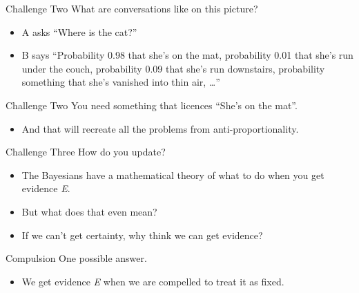 \documentclass[
  17pt,
  letterpaper,
  ignorenonframetext,
  aspectratio=169,
  handout]{beamer}
\providecommand{\tightlist}{%
  \setlength{\itemsep}{0pt}\setlength{\parskip}{0pt}}\usepackage{longtable,booktabs,array}
\begin{document}
\begin{frame}{Challenge Two}
\protect\hypertarget{challenge-two}{}
What are conversations like on this picture?

\begin{itemize}[<+->]
\tightlist
\item
  A asks ``Where is the cat?''
\item
  B says ``Probability 0.98 that she's on the mat, probability 0.01 that
  she's run under the couch, probability 0.09 that she's run downstairs,
  probability something that she's vanished into thin air, \ldots{}''
\end{itemize}
\end{frame}

\begin{frame}{Challenge Two}
\protect\hypertarget{challenge-two-1}{}
You need something that licences ``She's on the mat''.

\begin{itemize}[<+->]
\tightlist
\item
  And that will recreate all the problems from anti-proportionality.
\end{itemize}
\end{frame}

\begin{frame}{Challenge Three}
\protect\hypertarget{challenge-three}{}
How do you update?

\begin{itemize}[<+->]
\tightlist
\item
  The Bayesians have a mathematical theory of what to do when you get
  evidence \emph{E}.
\item
  But what does that even mean?
\item
  If we can't get certainty, why think we can get evidence?
\end{itemize}
\end{frame}

\begin{frame}{Compulsion}
\protect\hypertarget{compulsion-5}{}
One possible answer.

\begin{itemize}[<+->]
\tightlist
\item
  We get evidence \emph{E} when we are compelled to treat it as fixed.
\end{itemize}
\end{frame}
\end{document}
